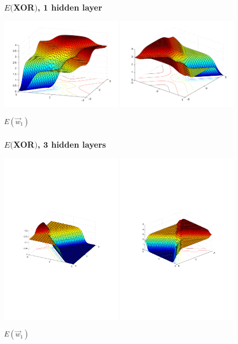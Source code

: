 \documentclass[USenglish,pdftex,compress,10pt,svgnamesi,handout]{beamer}
\begin{document}
\begin{frame}
\frametitle{$E($XOR$)$, 1 hidden layer}
\includegraphics[width=6cm]{pics/xor_in1_1hidden}
\includegraphics[width=6cm]{pics/xor_in2_1hidden}

$E(\Vec w_1)$
\end{frame}



\begin{frame}
\frametitle{$E($XOR$)$, 3 hidden layers}
\includegraphics[width=6cm]{pics/xor_in1_3hidden}
\includegraphics[width=6cm]{pics/xor_in2_3hidden}

$E(\Vec w_1)$
\end{frame}
\end{document}
